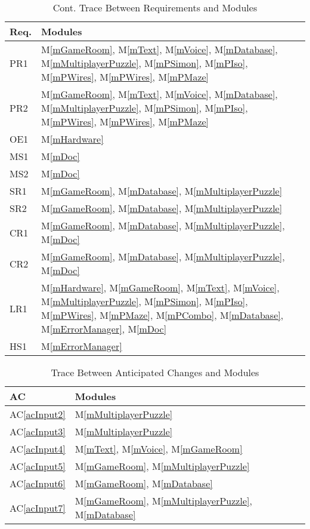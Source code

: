 \documentclass[12pt, titlepage]{article}
\newcommand{\acref}[1]{AC\ref{#1}}
\newcommand{\mref}[1]{M\ref{#1}}
\begin{document}
\begin{table}[H]
\centering
\begin{tabular}{p{} p{}}
\toprule
\textbf{Req.} & \textbf{Modules}\\
\midrule
PR1 & \mref{mGameRoom}, \mref{mText}, \mref{mVoice}, \mref{mDatabase}, \mref{mMultiplayerPuzzle}, \mref{mPSimon}, \mref{mPIso}, \mref{mPWires}, \mref{mPWires}, \mref{mPMaze}\\
PR2 & \mref{mGameRoom}, \mref{mText}, \mref{mVoice}, \mref{mDatabase}, \mref{mMultiplayerPuzzle}, \mref{mPSimon}, \mref{mPIso}, \mref{mPWires}, \mref{mPWires}, \mref{mPMaze}\\
OE1     & \mref{mHardware}\\
MS1& \mref{mDoc}\\
MS2& \mref{mDoc}\\
SR1 & \mref{mGameRoom}, \mref{mDatabase}, \mref{mMultiplayerPuzzle}\\
SR2 & \mref{mGameRoom}, \mref{mDatabase}, \mref{mMultiplayerPuzzle}\\
CR1 & \mref{mGameRoom}, \mref{mDatabase}, \mref{mMultiplayerPuzzle}, \mref{mDoc}\\
CR2 & \mref{mGameRoom}, \mref{mDatabase}, \mref{mMultiplayerPuzzle}, \mref{mDoc}\\
LR1     & \mref{mHardware}, \mref{mGameRoom}, \mref{mText}, \mref{mVoice},  \mref{mMultiplayerPuzzle}, \mref{mPSimon}, \mref{mPIso}, \mref{mPWires}, \mref{mPMaze}, \mref{mPCombo}, \mref{mDatabase}, \mref{mErrorManager}, \mref{mDoc}\\
HS1     & \mref{mErrorManager}\\
\bottomrule
\end{tabular}
\caption{Cont. Trace Between Requirements and Modules}
\label{TblRT3}
\end{table}

\begin{table}[H]
\centering
\begin{tabular}{p{} p{}}
\toprule
\textbf{AC} & \textbf{Modules}\\
\midrule
\acref{acInput2} & \mref{mMultiplayerPuzzle}\\
\acref{acInput3} & \mref{mMultiplayerPuzzle}\\
\acref{acInput4} & \mref{mText}, \mref{mVoice}, \mref{mGameRoom}\\
\acref{acInput5} & \mref{mGameRoom}, \mref{mMultiplayerPuzzle}\\
\acref{acInput6} & \mref{mGameRoom}, \mref{mDatabase}\\
\acref{acInput7} & \mref{mGameRoom}, \mref{mMultiplayerPuzzle}, \mref{mDatabase}\\
\bottomrule
\end{tabular}
\caption{Trace Between Anticipated Changes and Modules}
\label{TblACT}
\end{table}
\end{document}
